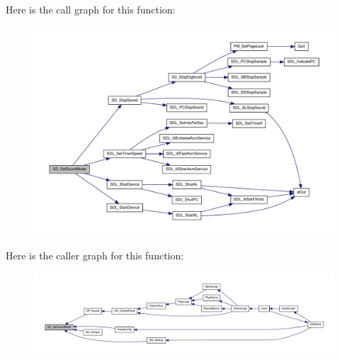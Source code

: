Here is the call graph for this function:
\nopagebreak
\begin{figure}[H]
\begin{center}
\leavevmode
\includegraphics[width=400pt]{ID__SD_8C_a5150708f32ce380003f87fe23288859a_cgraph}
\end{center}
\end{figure}




Here is the caller graph for this function:
\nopagebreak
\begin{figure}[H]
\begin{center}
\leavevmode
\includegraphics[width=400pt]{ID__SD_8C_a5150708f32ce380003f87fe23288859a_icgraph}
\end{center}
\end{figure}


